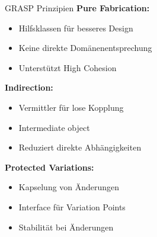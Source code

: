 \begin{concept}{GRASP Prinzipien}
\textbf{Pure Fabrication:}
\begin{itemize}
    \item Hilfsklassen für besseres Design
    \item Keine direkte Domänenentsprechung
    \item Unterstützt High Cohesion
\end{itemize}

\textbf{Indirection:}
\begin{itemize}
    \item Vermittler für lose Kopplung
    \item Intermediate object
    \item Reduziert direkte Abhängigkeiten
\end{itemize}

\textbf{Protected Variations:}
\begin{itemize}
    \item Kapselung von Änderungen
    \item Interface für Variation Points
    \item Stabilität bei Änderungen
\end{itemize}
\end{concept}

